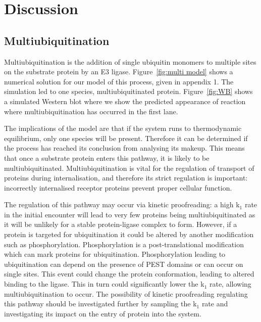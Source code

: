 \documentclass[11pt]{article}
\begin{document}
\section{Discussion}

\subsection{Multiubiquitination}
Multiubiquitination is the addition of single ubiquitin monomers to multiple sites on the substrate protein by an E3 ligase. Figure~\ref{fig:multi model} shows a numerical solution for our model of this process, given in appendix 1. The simulation led to one species, multiubiquitinated protein. Figure~\ref{fig:WB} shows a simulated Western blot where we show the predicted appearance of reaction where multiubiquitination has occurred in the first lane.

The implications of the model are that if the system runs to thermodynamic equilibrium, only one species will be present. Therefore it can be determined if the process has reached its conclusion from analysing its makeup. This means that once a substrate protein enters this pathway, it is likely to be multiubiquitinated. Multiubiquitination is vital for the regulation of transport of proteins during internalisation\cite{monami2008grb10,staub2006role,mosesson2003endocytosis,haglund2003multiple}, and therefore its strict regulation is important: incorrectly internalised receptor proteins prevent proper cellular function. 

The regulation of this pathway may occur via kinetic proofreading\cite{hopfield1974kinetic}: a high k$_{1}$ rate in the initial encounter will lead to very few proteins being multiubiquitinated as it will be unlikely for a stable protein-ligase complex to form. However, if a protein is targeted for ubiquitination it could be altered by another modification such as phosphorylation. Phosphorylation is a post-translational modification which can mark proteins for ubiquitination. Phosphorylation leading to ubiquitination can depend on the presence of PEST domains\cite{yaglom1995p34cdc28,lanker1996rapid,kornitzer1994regulated} or can occur on single sites\cite{won1996activation,diehl1997inhibition}. This event could change the protein conformation, leading to altered binding to the ligase. This in turn could significantly lower the k$_{1}$ rate, allowing multiubiquitination to occur. The possibility of kinetic proofreading regulating this pathway should be investigated further by sampling the k$_{1}$ rate and investigating its impact on the entry of protein into the system.
\end{document}
